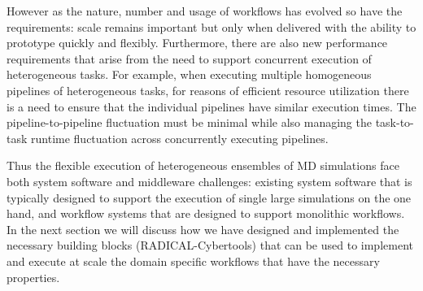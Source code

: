 However as the nature, number and usage of workflows has evolved so have the
requirements: scale remains important but only when delivered with the ability
to prototype quickly and flexibly. Furthermore, there are also new performance
requirements that arise from the need to support concurrent execution of
heterogeneous tasks. For example, when executing multiple homogeneous
pipelines of heterogeneous tasks, for reasons of efficient resource
utilization there is a need to ensure that the individual pipelines have
similar execution times. The pipeline-to-pipeline fluctuation must be minimal
while also managing the task-to-task runtime fluctuation across concurrently
executing pipelines.

Thus the flexible execution of heterogeneous ensembles of MD simulations face
both system software and middleware challenges: existing system software that
is typically designed to support the execution of single large simulations on
the one hand, and workflow systems that are designed to support monolithic
workflows.  In the next section we will discuss how we have designed and
implemented the necessary building blocks (RADICAL-Cybertools) that can be
used to implement and execute at scale the domain specific workflows that have
the necessary properties.








